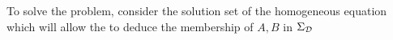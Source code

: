 \begin{comment}
	
	The following example further illustrates the difference between informativity for stabilizability and informativity for stabilization.

	\begin{exm}[Stabilizability and stabilization]
		Consider the scalar system 
		$
		\bmx(t+1)= \bmu(t),
		$
		where $\bmx, \bmu \in \mathbb{R}$. Suppose that we collect data on the single time interval $\{0,1\}$, specifically, $x(0) = 0$, $u(0) = 1$ and $x(1) = 1$. This means that $U_- = \begin{bmatrix}1 \end{bmatrix}$ and $X = \begin{bmatrix}0 & 1	\end{bmatrix}$. It can be shown that $\Sigma_\calD = \{(a,1) \mid a \in \mathbb{R}\}$. Clearly, all systems in $\Sigma_\calD$ are stabilizable. Nonetheless, the data are not informative for \emph{stabilization}. This is because the systems $(-1,1)$ and $(1,1)$ in $\Sigma_\calD$ cannot be stabilized by the \emph{same} controller of the form $u(t) = K x(t)$. 
		We conclude that informativity of the data for stabilizability does not imply informativity for stabilization by state feedback. 
	\end{exm}

	Having defined the notion of informativity for stabilization, we now take the steps described in the introduction. First, we resolve Problem~\ref{ch1:prob:parametrized}, that is, we find necessary and sufficient conditions for informativity for stabilization by state feedback. After this, we design a corresponding controller, as described in Problem~\ref{ch1:prob:design}. 

\end{comment}
To solve the problem, consider the solution set of the homogeneous equation which will allow the to deduce the membership of $A,B$ in $\Sigma_{\mathcal{D}}$
